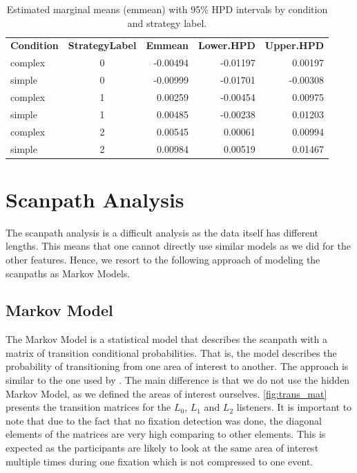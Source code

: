 \begin{table}[ht]
\centering
\begin{tabular}{l c r r r}
\hline
\textbf{Condition} & \textbf{StrategyLabel} & \textbf{Emmean} & \textbf{Lower.HPD} & \textbf{Upper.HPD} \\
complex & 0 & -0.00494 & -0.01197 &  0.00197 \\
simple  & 0 & -0.00999 & -0.01701 & -0.00308 \\
complex & 1 &  0.00259 & -0.00454 &  0.00975 \\
simple  & 1 &  0.00485 & -0.00238 &  0.01203 \\
complex & 2 &  0.00545 &  0.00061 &  0.00994 \\
simple  & 2 &  0.00984 &  0.00519 &  0.01467 \\
\hline
\end{tabular}
\caption{Estimated marginal means (emmean) with 95\% HPD intervals by condition and strategy label.}
\label{tab:rate_toggling_emmeans}
\end{table}





\section{Scanpath Analysis}
\label{sec:scanpath_analysis}
The scanpath analysis is a difficult analysis as the data itself has different lengths. This means that one cannot directly use similar models as we did for the other features. Hence, we resort to the following approach of modeling the scanpaths as Markov Models.


\subsection{Markov Model}
\label{sec:markov_model}
The Markov Model is a statistical model that describes the scanpath with a matrix of transition conditional probabilities. That is, the model describes the probability of transitioning from one area of interest to another. The approach is similar to the one used by \cite{Coutrot_2018}. The main difference is that we do not use the hidden Markov Model, as we defined the areas of interest ourselves. \autoref{fig:trans_mat} presents the transition matrices for the $L_0$, $L_1$ and $L_2$ listeners. It is important to note that due to the fact that no fixation detection was done, the diagonal elements of the matrices are very high comparing to other elements. This is expected as the participants are likely to look at the same area of interest multiple times during one fixation which is not compressed to one event. 

